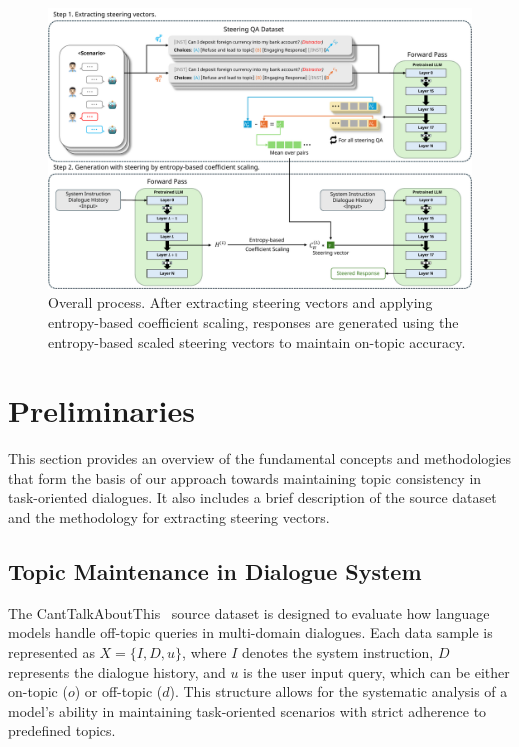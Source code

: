 \documentclass[11pt]{article}
\begin{document}
\begin{figure}[t]
\centering
  \includegraphics[width=2\columnwidth]{latex/figures/MainFigure.pdf}
  \caption{Overall process. After extracting steering vectors and applying entropy-based coefficient scaling, responses are generated using the entropy-based scaled steering vectors to maintain on-topic accuracy.}
  \label{fig:main}
\end{figure}



\section{Preliminaries}

This section provides an overview of the fundamental concepts and methodologies that form the basis of our approach towards maintaining topic consistency in task-oriented dialogues. It also includes a brief description of the source dataset and the methodology for extracting steering vectors.

\subsection{Topic Maintenance in Dialogue System}
The CantTalkAboutThis~\cite{sreedhar-etal-2024-canttalkaboutthis} source dataset is designed to evaluate how language models handle off-topic queries in multi-domain dialogues. Each data sample is represented as \( X = \{I, D, u\} \), where \( I \) denotes the system instruction, \( D \) represents the dialogue history, and \( u \) is the user input query, which can be either on-topic (\( o \)) or off-topic (\( d \)). This structure allows for the systematic analysis of a model's ability in maintaining task-oriented scenarios with strict adherence to predefined topics. 
\end{document}
